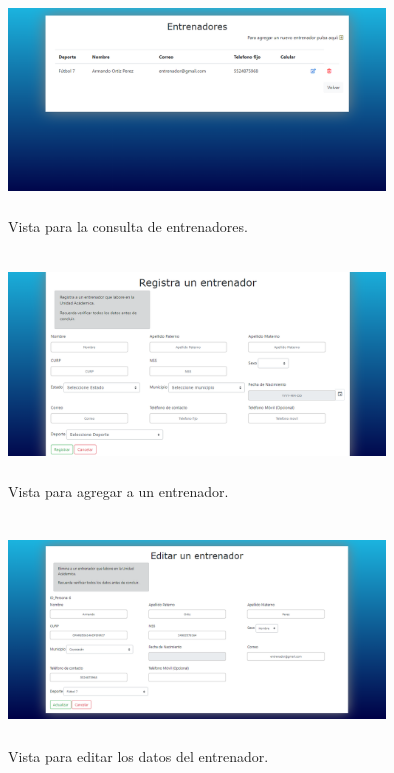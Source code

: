 		\begin{figure} [hbt!]
			\centering
			\includegraphics[width=10cm, height=6cm]{Imagenes/Vistas/Vista15_ConsultaEntrenador}
			\caption{Vista para la consulta de entrenadores.}
			\label{VistaConsultaEntrenador}
		\end{figure}
		
		\begin{figure} [hbt!]
			\centering
			\includegraphics[width=10cm, height=6cm]{Imagenes/Vistas/Vista16_AgregaEntrenador}
			\caption{Vista para agregar a un entrenador.}
			\label{VistaAgregarEntrenador}
		\end{figure}
	
		\begin{figure} [hbt!]
			\centering
			\includegraphics[width=10cm, height=6cm]{Imagenes/Vistas/Vista17_EditarEntrenador}
			\caption{Vista para editar los datos del entrenador.}
			\label{VistaEditarEntrenador}
		\end{figure}
		
